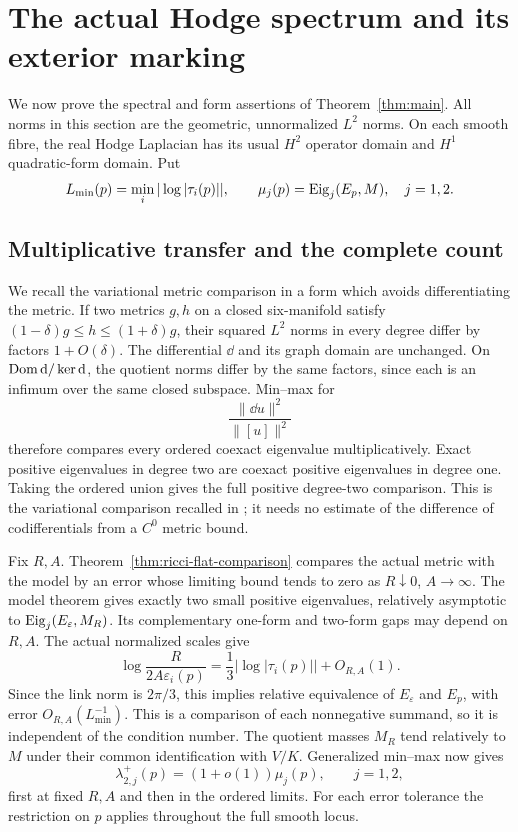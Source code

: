 \section{The actual Hodge spectrum and its exterior marking}
\label{sec:actual-hodge}

We now prove the spectral and form assertions of
Theorem~\ref{thm:main}. All norms in this section are the
geometric, unnormalized $L^2$ norms. On each smooth fibre,
the real Hodge Laplacian has its usual $H^2$ operator
domain and $H^1$ quadratic-form domain. Put
\[
 L_{\min}(p)=\min_i|\log|\tau_i(p)||,\qquad
 \mu_j(p)=\operatorname{Eig}_j(E_p,M),\quad j=1,2.
\]

\subsection{Multiplicative transfer and the complete count}

We recall the variational metric comparison in a form
which avoids differentiating the metric. If two metrics
$g,h$ on a closed six-manifold satisfy
$(1-\delta)g\le h\le(1+\delta)g$, their squared
$L^2$ norms in every degree differ by factors
$1+O(\delta)$. The differential $\dd$ and its graph
domain are unchanged. On $\operatorname{Dom}\mathrm d/\ker\mathrm d$, the quotient
norms differ by the same factors, since each is an
infimum over the same closed subspace. Min--max for
\[
 \frac{\|\dd u\|^2}{\|[u]\|^2}
\]
therefore compares every ordered coexact eigenvalue
multiplicatively. Exact positive eigenvalues in degree
two are coexact positive eigenvalues in degree one.
Taking the ordered union gives the full positive
degree-two comparison. This is the variational
comparison recalled in \cite[Section~6]{wuebben-hodge};
it needs no estimate of the difference of
codifferentials from a $C^0$ metric bound.

Fix $R,A$. Theorem~\ref{thm:ricci-flat-comparison}
compares the actual metric with the model by an
error whose limiting bound tends to zero as
$R\downarrow0$, $A\to\infty$. The model theorem
gives exactly two small positive eigenvalues,
relatively asymptotic to
$\operatorname{Eig}_j(E_\varepsilon,M_R)$. Its complementary
one-form and two-form gaps may depend on $R,A$.
The actual normalized scales give
\begin{equation}\label{eq:log-length-conversion}
 \log\frac{R}{2A\varepsilon_i(p)}
       =\frac13|\log|\tau_i(p)||+O_{R,A}(1).
\end{equation}
Since the link norm is $2\pi/3$, this implies
relative equivalence of $E_\varepsilon$ and
$E_p$, with error $O_{R,A}(L_{\min}^{-1})$.
This is a comparison of each nonnegative summand,
so it is independent of the condition number.
The quotient masses $M_R$ tend relatively to
$M$ under their common identification with $V/K$.
Generalized min--max now gives
\begin{equation}\label{eq:actual-relative-rates}
 \lambda_{2,j}^+(p)=(1+o(1))\mu_j(p),\qquad j=1,2,
\end{equation}
first at fixed $R,A$ and then in the ordered
limits. For each error tolerance the restriction
on $p$ applies throughout the full smooth locus.

